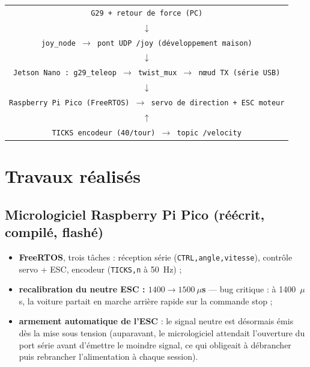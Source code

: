 \documentclass[11pt,a4paper]{article}
\begin{document}
\begin{center}
\small
\begin{tabular}{c}
\texttt{G29 + retour de force (PC)} \\
$\downarrow$ \\
\texttt{joy\_node $\rightarrow$ pont UDP /joy (développement maison)} \\
$\downarrow$ \\
\texttt{Jetson Nano : g29\_teleop $\rightarrow$ twist\_mux $\rightarrow$ n\oe ud TX (série USB)} \\
$\downarrow$ \\
\texttt{Raspberry Pi Pico (FreeRTOS) $\rightarrow$ servo de direction + ESC moteur} \\
$\uparrow$ \\
\texttt{TICKS encodeur (40/tour) $\rightarrow$ topic /velocity} \\
\end{tabular}
\end{center}

\section{Travaux réalisés}

\subsection{Micrologiciel Raspberry Pi Pico (réécrit, compilé, flashé)}
\begin{itemize}[itemsep=2pt]
  \item \textbf{FreeRTOS}, trois tâches : réception série
        (\texttt{CTRL,angle,vitesse}), contrôle servo + ESC, encodeur
        (\texttt{TICKS,n} à 50~Hz) ;
  \item \textbf{recalibration du neutre ESC : $1400 \rightarrow 1500~\mu$s} ---
        bug critique : à 1400~$\mu$s, la voiture partait en marche arrière rapide
        sur la commande \og stop \fg{} ;
  \item \textbf{armement automatique de l'ESC} : le signal neutre est désormais
        émis dès la mise sous tension (auparavant, le micrologiciel attendait
        l'ouverture du port série avant d'émettre le moindre signal, ce qui
        obligeait à débrancher puis rebrancher l'alimentation à chaque session).
\end{itemize}
\end{document}
